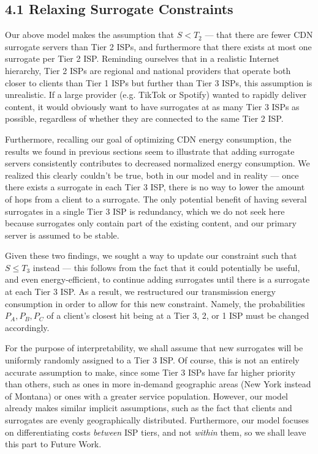 \documentclass[
	a4paper, %
	10pt, %
	unnumberedsections, %
	twoside, %
]{LTJournalArticle}
\begin{document}
\subsection{4.1 Relaxing Surrogate Constraints}
Our above model makes the assumption that $S < T_2$ --- that there are fewer CDN surrogate servers than Tier 2 ISPs, and furthermore that there exists at most one surrogate per Tier 2 ISP. Reminding ourselves that in a realistic Internet hierarchy, Tier 2 ISPs are regional and national providers that operate both closer to clients than Tier 1 ISPs but further than Tier 3 ISPs, this assumption is unrealistic. If a large provider (e.g. TikTok or Spotify) wanted to rapidly deliver content, it would obviously want to have surrogates at as many Tier 3 ISPs as possible, regardless of whether they are connected to the same Tier 2 ISP. 

Furthermore, recalling our goal of optimizing CDN energy consumption, the results we found in previous sections seem to illustrate that adding surrogate servers consistently contributes to decreased normalized energy consumption. We realized this clearly couldn't be true, both in our model and in reality --- once there exists a surrogate in each Tier 3 ISP, there is no way to lower the amount of hops from a client to a surrogate. The only potential benefit of having several surrogates in a single Tier 3 ISP is redundancy, which we do not seek here because surrogates only contain part of the existing content, and our primary server is assumed to be stable. 

Given these two findings, we sought a way to update our constraint such that $S \leq T_3$ instead --- this follows from the fact that it could potentially be useful, and even energy-efficient, to continue adding surrogates until there is a surrogate at each Tier 3 ISP. As a result, we restructured our transmission energy consumption in order to allow for this new constraint. Namely, the probabilities $P_A, P_B, P_C$ of a client's closest hit being at a Tier 3, 2, or 1 ISP must be changed accordingly. 

For the purpose of interpretability, we shall assume that new surrogates will be uniformly randomly assigned to a Tier 3 ISP. Of course, this is not an entirely accurate assumption to make, since some Tier 3 ISPs have far higher priority than others, such as ones in more in-demand geographic areas (New York instead of Montana) or ones with a greater service population. However, our model already makes similar implicit assumptions, such as the fact that clients and surrogates are evenly geographically distributed. Furthermore, our model focuses on differentiating costs \textit{between} ISP tiers, and not \textit{within} them, so we shall leave this part to Future Work.
\end{document}
